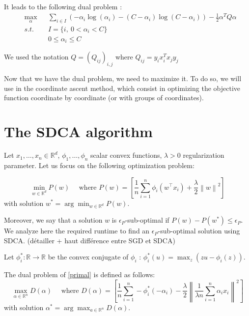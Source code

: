 \documentclass{article}
\newcommand{\norm}[1]{\left\|#1 \right\|}
\begin{document}
It leads to the following dual problem :
\begin{equation}
	\begin{aligned}
		& \max_{\alpha} & &\sum_{i \in I} (-\alpha_i \log(\alpha_i) - (C-\alpha_i) \log(C - \alpha_i)) - \frac{1}{2} \alpha^TQ\alpha\\
		& s.t.          & &I = \{i,\ 0 < \alpha_i < C \}\\
		&               & &0 \leq \alpha_i \leq C
	\end{aligned}
\end{equation}

We used the notation $Q = (Q_{ij})_{i,j}$ where $Q_{ij} = y_i x_i^T x_j y_j$

Now that we have the dual problem, we need to maximize it.
To do so, we will use in the coordinate ascent method, which consist in optimizing the objective function coordinate by coordinate (or with groups of coordinates).


\newpage
\section{The SDCA algorithm}

Let $x_1, \dots, x_n \in \mathbb{R}^d$, $\phi_1, \dots, \phi_n$ scalar convex functions, $\lambda > 0$ regularization parameter.
Let us focus on the following optimization problem:

\begin{equation}
    \min_{w \in \mathbb{R}^d} P(w) \quad \text{ where } P(w) = \left[ \dfrac{1}{n} \sum_{i=1}^n \phi_i(w^\top x_i) + \dfrac{\lambda}{2}\norm{w}^2 \right]
    \label{primal}
\end{equation}
with solution $w^{*} = \arg \min_{w \in \mathbb{R}^d} P(w)$.

Moreover, we say that a solution $w$ is $\epsilon_P$-sub-optimal if $P(w) - P(w^{*}) \leq \epsilon_P$.
We analyze here the required runtime to find an $\epsilon_P$-sub-optimal solution using SDCA. (détailler + haut différence entre SGD et SDCA)

Let $\phi_i^{*} : \mathbb{R} \rightarrow \mathbb{R}$ be the convex conjugate of $\phi_i$ : $\phi_i^{*}(u) = \max_z (zu-\phi_i(z))$.

The dual problem of \eqref{primal} is defined as follows:
\begin{equation}
    \max_{\alpha \in \mathbb{R}^n} D(\alpha) \quad \text{ where } D(\alpha) = \left[ \dfrac{1}{n} \sum_{i=1}^n -\phi_i^{*}(-\alpha_i) - \dfrac{\lambda}{2}\norm{\dfrac{1}{\lambda n}\sum_{i=1}^n \alpha_ix_i}^2 \right]
    \label{dual}
\end{equation}
with solution $\alpha^{*} = \arg \max_{a \in \mathbb{R}^n} D(\alpha)$.
\end{document}
